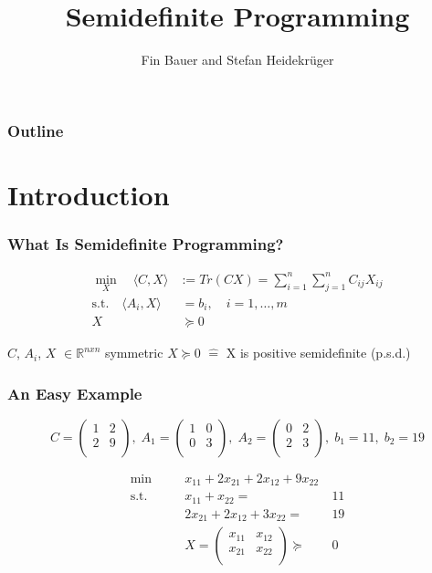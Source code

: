 \documentclass[11pt]{beamer}
\author{Fin Bauer and Stefan Heidekrüger}
\title{Semidefinite Programming}
\begin{document}
	\maketitle
\begin{frame}
	\frametitle{Outline}
	\tableofcontents
\end{frame}
\section{Introduction}	
	\begin{frame}
		\frametitle{What Is Semidefinite Programming?}
	\begin{block}{\vspace*{-3ex}}
		\begin{equation*}
		\begin{aligned}
		\min_X \quad\langle C,X \rangle &:= Tr(CX)=\sum_{i=1}^{n}\sum_{j=1}^{n}C_{ij}X_{ij}\\
		\text{s.t.}\quad\langle A_i,X\rangle&\:= b_i,\quad i=1,\dots,m\\
		X&\:\succeq 0
		\end{aligned}
		\end{equation*}
	\end{block}
	$C$, $A_i$, $X$ $\in \mathbb{R}^{nxn}$ symmetric \newline $X \succeq 0$ $\hat{=}$ X is positive semidefinite (p.s.d.)
	\end{frame}
	\begin{frame}
		\frametitle{An Easy Example}
		\begin{equation*}
		C=\begin{pmatrix}
		1 & 2 \\
		2 & 9 \\
		\end{pmatrix},\; A_1=\begin{pmatrix}
		1 & 0 \\
		0 & 3 \\
		\end{pmatrix},\; A_2=\begin{pmatrix}
		0 & 2 \\
		2 & 3 \\
		\end{pmatrix},\; b_1=11,\; b_2=19
		\end{equation*}
		\pause
		\begin{block}{\vspace*{-3ex}}
		\begin{equation*}
		\begin{aligned}
		\min\quad && x_{11}+2x_{21}+2x_{12}+9x_{22}\\
		\text{s.t.}\quad&& x_{11}+x_{22}= & \:11\\
		&&  2x_{21}+2x_{12}+3x_{22}= & \:19\\
		&& X=\begin{pmatrix}
		x_{11}& x_{12}\\
		x_{21}& x_{22}\\
		\end{pmatrix}\succeq&\: 0
		\end{aligned}
		\end{equation*}
		\end{block}
	\end{frame}
\end{document}
